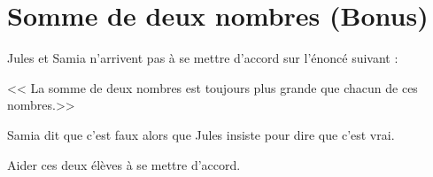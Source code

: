 \section{Somme de deux nombres (Bonus)}

Jules et Samia n'arrivent pas à se mettre d'accord sur l'énoncé suivant :

<< La somme de deux nombres est toujours plus grande que chacun de ces nombres.>>

Samia dit que c'est faux alors que Jules insiste pour dire que c'est vrai.

\begin{questions}
	\question Aider ces deux élèves à se mettre d'accord.
\end{questions}
